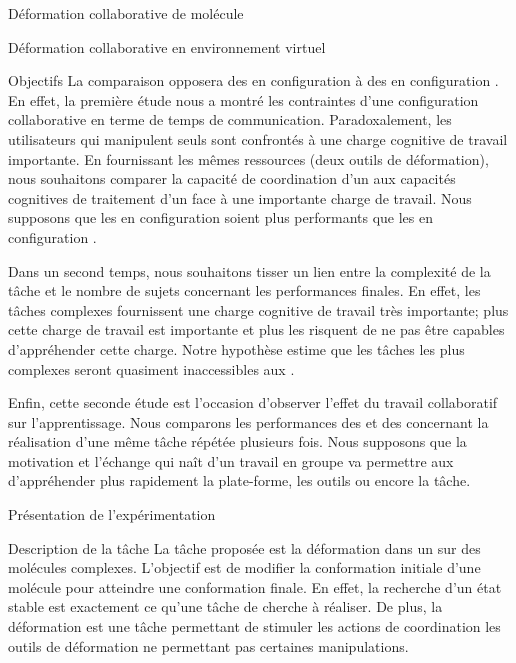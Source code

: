 \documentclass[myfrancais]{mythesis}
\begin{document}
\begin{mychapter}{Déformation collaborative de molécule}
\begin{mysection}{Déformation collaborative en environnement virtuel}
\begin{mysubsection}{Objectifs}
				La comparaison opposera des  en configuration  à des  en configuration .
				En effet, la première étude nous a montré les contraintes d'une configuration collaborative en terme de temps de communication.
				Paradoxalement, les utilisateurs qui manipulent seuls sont confrontés à une charge cognitive de travail importante.
				En fournissant les mêmes ressources (deux outils de déformation), nous souhaitons comparer la capacité de coordination d'un  aux capacités cognitives de traitement d'un  face à une importante charge de travail.
				Nous supposons que les  en configuration  soient plus performants que les  en configuration .

				Dans un second temps, nous souhaitons tisser un lien entre la complexité de la tâche et le nombre de sujets concernant les performances finales.
				En effet, les tâches complexes fournissent une charge cognitive de travail très importante; plus cette charge de travail est importante et plus les  risquent de ne pas être capables d'appréhender cette charge.
				Notre hypothèse estime que les tâches les plus complexes seront quasiment inaccessibles aux .

				Enfin, cette seconde étude est l'occasion d'observer l'effet du travail collaboratif sur l'apprentissage.
				Nous comparons les performances des  et des  concernant la réalisation d'une même tâche répétée plusieurs fois.
				Nous supposons que la motivation et l'échange qui naît d'un travail en groupe va permettre aux  d'appréhender plus rapidement la plate-forme, les outils ou encore la tâche.
			\end{mysubsection}
		\end{mysection}
		\begin{mysection}{Présentation de l'expérimentation}
			\begin{mysubsection}{Description de la tâche}
				La tâche proposée est la déformation dans un  sur des molécules complexes.
				L'objectif est de modifier la conformation initiale d'une molécule pour atteindre une conformation finale.
				En effet, la recherche d'un état stable est exactement ce qu'une tâche de  cherche à réaliser.
				De plus, la déformation est une tâche permettant de stimuler les actions de coordination les outils de déformation ne permettant pas certaines manipulations.


\end{mysubsection}
\end{mysection}
\end{mychapter}
\end{document}
